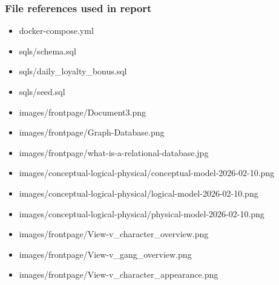 \hypertarget{file-references-used-in-report}{%
\subsubsection{File references used in
report}\label{file-references-used-in-report}}

\begin{itemize}
\tightlist
\item
  docker-compose.yml
\item
  sqls/schema.sql
\item
  sqls/daily\_loyalty\_bonus.sql
\item
  sqls/seed.sql
\item
  images/frontpage/Document3.png
\item
  images/frontpage/Graph-Database.png
\item
  images/frontpage/what-is-a-relational-database.jpg
\item
  images/conceptual-logical-physical/conceptual-model-2026-02-10.png
\item
  images/conceptual-logical-physical/logical-model-2026-02-10.png
\item
  images/conceptual-logical-physical/physical-model-2026-02-10.png
\item
  images/frontpage/View-v\_character\_overview.png
\item
  images/frontpage/View-v\_gang\_overview.png
\item
  images/frontpage/View-v\_character\_appearance.png
\end{itemize}
